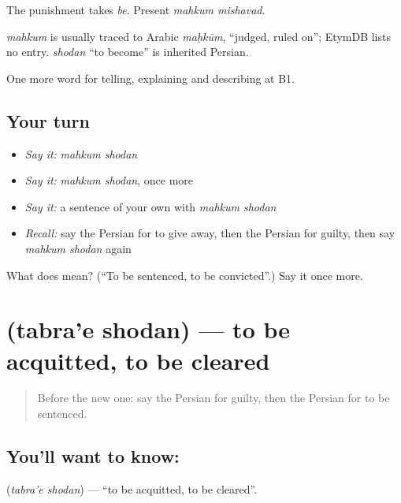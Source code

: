 The punishment takes \emph{be}. Present \emph{mahkum mishavad}.

\begin{cousinweb}
\emph{mahkum} is usually traced to Arabic \emph{maḥkūm}, \textquotedblleft{}judged, ruled on\textquotedblright{}; EtymDB lists no entry. \emph{shodan} \textquotedblleft{}to become\textquotedblright{} is inherited Persian.
\end{cousinweb}

\begin{grammarlens}[title={What you've built}]
One more word for telling, explaining and describing at B1.
\end{grammarlens}

\subsection*{Your turn}
\begin{itemize}
\raggedright
  \item \emph{Say it:} \emph{mahkum shodan}
  \item \emph{Say it:} \emph{mahkum shodan}, once more
  \item \emph{Say it:} a sentence of your own with \emph{mahkum shodan}
  \item \emph{Recall:} say the Persian for to give away, then the Persian for guilty, then say \emph{mahkum shodan} again
\end{itemize}

\begin{tcolorbox}[breakable,colback=teal!4,colframe=teal!35!black,title={Before you move on}]
What does   mean? (\textquotedblleft{}To be sentenced, to be convicted\textquotedblright{}.) Say it once more.
\end{tcolorbox}
\section[\texorpdfstring{\fa{تبرئه} \fa{شدن} (tabra'e shodan)}{تبرئه شدن (tabra'e shodan)}]{  (tabra'e shodan) — to be acquitted, to be cleared}

\label{lesson:FA-C322-tabrae-shodan}



\begin{quote}
Before the new one: say the Persian for guilty, then the Persian for to be sentenced.
\end{quote}

\subsection*{You'll want to know:  }
\textbf{ } (\emph{tabra'e shodan}) — \textquotedblleft{}to be acquitted, to be cleared\textquotedblright{}.

